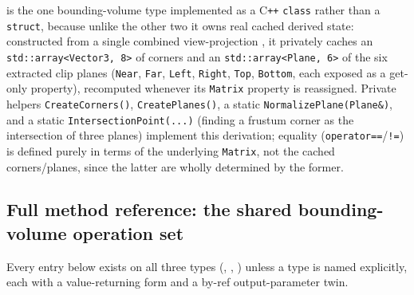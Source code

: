  is the one bounding-volume type implemented as a C\texttt{++}
\texttt{class} rather than a \texttt{struct}, because unlike the other two it owns real
cached derived state: constructed from a single combined view-projection ,
it privately caches an \texttt{std::array<Vector3, 8>} of corners and an
\texttt{std::array<Plane, 6>} of the six extracted clip planes (\texttt{Near}, \texttt{Far},
\texttt{Left}, \texttt{Right}, \texttt{Top}, \texttt{Bottom}, each exposed as a get-only
 property), recomputed whenever its \texttt{Matrix} property is reassigned.
Private helpers \texttt{CreateCorners()}, \texttt{CreatePlanes()}, a static
\texttt{NormalizePlane(Plane\&)}, and a static \texttt{IntersectionPoint(...)} (finding a
frustum corner as the intersection of three planes) implement this derivation; equality
(\texttt{operator==}/\texttt{!=}) is defined purely in terms of the underlying \texttt{Matrix},
not the cached corners/planes, since the latter are wholly determined by the former.

\subsection{Full method reference: the shared bounding-volume operation set}
\label{sec:bounding-volumes-full-reference}

Every entry below exists on all three types (, ,
) unless a type is named explicitly, each with a value-returning form
and a by-ref output-parameter twin.

